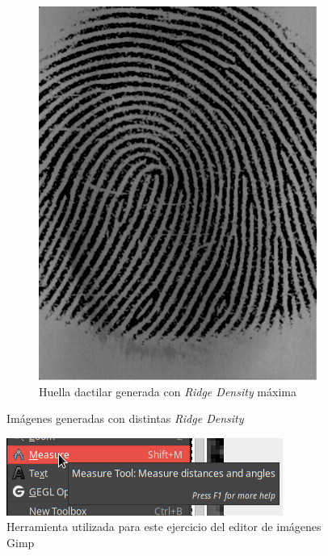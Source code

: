 \documentclass[10pt,a4paper]{article}
\begin{document}
\begin{figure}[h!]
\begin{subfigure}{.5\textwidth}
  \includegraphics[width=.7\linewidth]{1.2/max_original.png}
  \caption{Huella dactilar generada con \textit{Ridge Density} máxima}
  \label{fig:max_ridge}
\end{subfigure}
\caption{Imágenes generadas con distintas \textit{Ridge Density}}
\label{fig:ridge}
\end{figure}

\begin{figure}[h!]
  \centering
  \includegraphics[width=.7\linewidth]{1.2/measure.png}
  \caption{Herramienta utilizada para este ejercicio del editor de imágenes Gimp}
  \label{fig:measure}
\end{figure}
\end{document}
